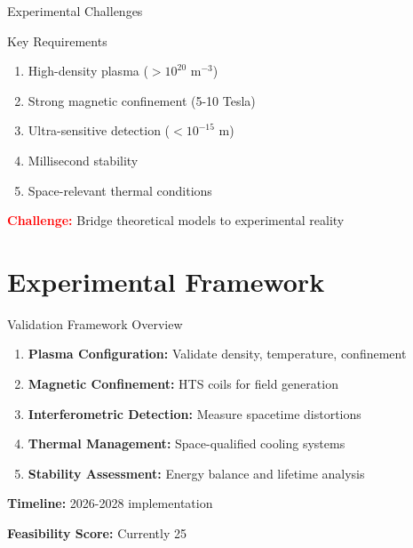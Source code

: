 \documentclass[aspectratio=169,xcolor={table,dvipsnames}]{beamer}
\newcommand{\highlight}[1]{\textcolor{red}{\textbf{#1}}}
\begin{document}
\begin{frame}{Experimental Challenges}
    \begin{block}{Key Requirements}
        \begin{enumerate}
            \item High-density plasma ($>10^{20}$ m$^{-3}$)
            \item Strong magnetic confinement (5-10 Tesla)
            \item Ultra-sensitive detection ($<10^{-15}$ m)
            \item Millisecond stability
            \item Space-relevant thermal conditions
        \end{enumerate}
    \end{block}
    
    \highlight{Challenge:} Bridge theoretical models to experimental reality
\end{frame}

\section{Experimental Framework}

\begin{frame}{Validation Framework Overview}
    \begin{enumerate}
        \item \textbf{Plasma Configuration:} Validate density, temperature, confinement
        \item \textbf{Magnetic Confinement:} HTS coils for field generation
        \item \textbf{Interferometric Detection:} Measure spacetime distortions
        \item \textbf{Thermal Management:} Space-qualified cooling systems
        \item \textbf{Stability Assessment:} Energy balance and lifetime analysis
    \end{enumerate}
    
    \vspace{0.5cm}
    \textbf{Timeline:} 2026-2028 implementation
    
    \textbf{Feasibility Score:} Currently 25%
\end{frame}
\end{document}
